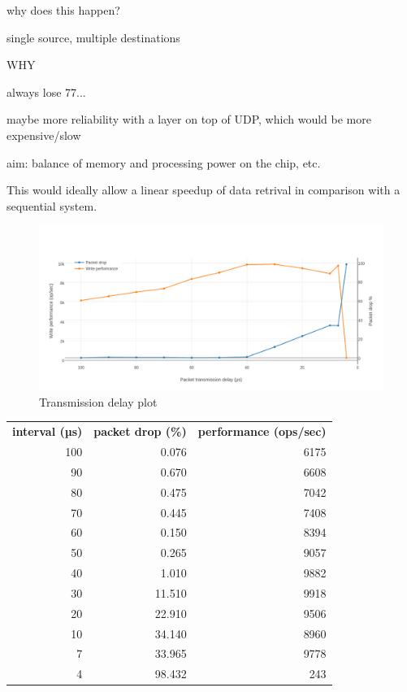 why does this happen?

single source, multiple destinations


WHY


always lose 77...

maybe more reliability with a layer on top of UDP, which would be more expensive/slow



aim: balance of memory and processing power on the chip, etc.


This would ideally allow a linear speedup of data retrival in comparison with a sequential system.

\begin{figure}
\begin{center}
	\includegraphics[width=1.4\textwidth, natwidth=1063, natheight=509]{images/transmission_delay.png}
\end{center}
\caption{Transmission delay plot}
\label{fig:transmission-delay}
\end{figure}

\begin{tabular}{ r | r | r }
\textbf{interval (µs)} & \textbf{packet drop (\%)} & \textbf{performance (ops/sec)}  \\
100 & 0.076 &	6175 \\
90	& 0.670	& 6608 \\
80	& 0.475	& 7042 \\
70	& 0.445	& 7408 \\
60	& 0.150	& 8394 \\
50	& 0.265	& 9057 \\
40	& 1.010	& 9882 \\
30	& 11.510	& 9918 \\
20	& 22.910	& 9506 \\ 
10	& 34.140	& 8960 \\
7	& 33.965 & 9778 \\
4	& 98.432 & 243 \\
\end{tabular}

